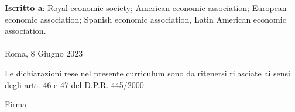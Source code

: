 \documentclass[10p]{article}
\begin{document}
\textbf{Iscritto a}: Royal economic society; American economic association; European economic association; Spanish economic association, Latin American economic association.
\\
\\

%

\bigskip
Roma, 8 Giugno 2023
\bigskip


Le dichiarazioni rese nel presente curriculum sono da ritenersi rilasciate ai sensi degli artt. 46 e 47 del D.P.R. 445/2000


\begin{flushright}
Firma
\end{flushright}
\end{document}
